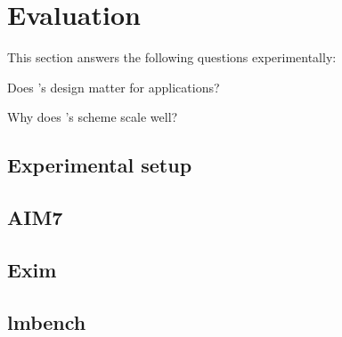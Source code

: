 \section{Evaluation}

This section answers the following questions experimentally:
\begin{CompactItemize}
\item Does \ldu's design matter for applications?

\item Why does \ldu's scheme scale well?
\end{CompactItemize}


\subsection{Experimental setup}


\subsection{AIM7}


\subsection{Exim}


\subsection{lmbench}

















